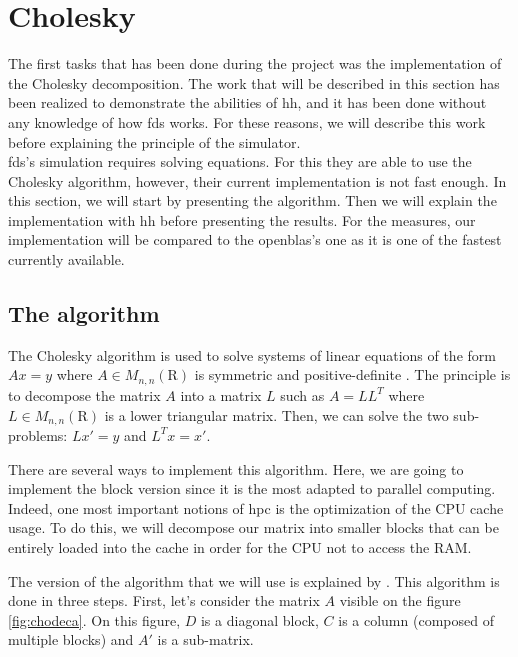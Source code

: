 
\section{Cholesky}

The first tasks that has been done during the project was the implementation of
the Cholesky decomposition. The work that will be described in this section has
been realized to demonstrate the abilities of \gls{hh}, and it has been done
without any knowledge of how \gls{fds} works. For these reasons, we will
describe this work before explaining the principle of the simulator.\\

\gls{fds}'s simulation requires solving equations. For this they are able to use
the Cholesky algorithm, however, their current implementation is not fast
enough. In this section, we will start by presenting the algorithm. Then we will
explain the implementation with \gls{hh} before presenting the results. For the
measures, our implementation will be compared to the openblas's one as it is one
of the fastest currently available.

\subsection{The algorithm}
\label{sec:choalgo}

The Cholesky algorithm is used to solve systems of linear equations of the form
$Ax = y$ where $A \in M_{n,n}(\mathrm{R})$ is symmetric and positive-definite
\cite{choleskywiki}. The principle is to decompose the matrix $A$ into a matrix
$L$ such as $A = LL^{T}$ where $L \in M_{n,n}(\mathrm{R})$ is a lower triangular
matrix. Then, we can solve the two sub-problems: $Lx' = y$ and $L^{T}x = x'$.

There are several ways to implement this algorithm. Here, we are going to
implement the block version since it is the most adapted to parallel computing.
Indeed, one most important notions of \gls{hpc} is the optimization of the CPU
cache usage. To do this, we will decompose our matrix into smaller blocks that
can be entirely loaded into the cache in order for the CPU not to access the
RAM.

The version of the algorithm that we will use is explained by
\cite{choleskyblock}. This algorithm is done in three steps. First, let's
consider the matrix $A$ visible on the figure \ref{fig:chodeca}. On this figure,
$D$ is a diagonal block, $C$ is a column (composed of multiple blocks) and $A'$
is a sub-matrix.


